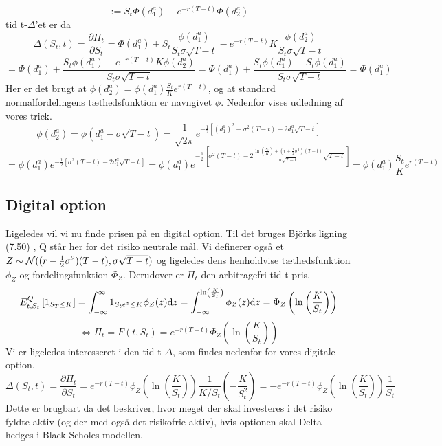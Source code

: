 \documentclass{article}
\theoremstyle{definition}
\theoremstyle{remark}
\newcommand\ens{\Leftrightarrow}
\begin{document}
$$:= S_t\Phi(d_1^a)-e^{-r(T-t)}\Phi(d_2^a)$$
tid t-$\Delta$'et er da
$$\Delta(S_t,t) = \frac{\partial \Pi_t}{\partial S_t}=\Phi(d_1^a)+S_t\frac{\phi(d_1^a)}{S_t\sigma\sqrt{T-t}}-e^{-r(T-t)}K\frac{\phi(d_2^a)}{S_t\sigma\sqrt{T-t}}$$
$$=\Phi(d_1^a)+\frac{S_t\phi(d_1^a)-e^{-r(T-t)}K\phi(d_2^a)}{S_t\sigma\sqrt{T-t}}=\Phi(d_1^a)+\frac{S_t\phi(d_1^a)-S_t\phi(d_1^a)}{S_t\sigma\sqrt{T-t}}=\Phi(d_1^a)$$
Her er det brugt at $\phi(d_2^a)=\phi(d_1^a)\frac{S_t}{K}e^{r(T-t)}$, og at standard normalfordelingens tæthedsfunktion er navngivet $\phi$. Nedenfor vises udledning af vores trick.
$$\phi(d_2^a)=\phi(d_1^a-\sigma\sqrt{T-t})=\frac{1}{\sqrt{2\pi}}e^{-\frac12\left[(d_1^a)^2+\sigma^2(T-t)-2d_1^a\sqrt{T-t}\right]}$$
$$=\phi(d_1^a)e^{-\frac12\left[\sigma^2(T-t)-2d_1^a\sqrt{T-t}\right]}=\phi(d_1^a)e^{-\frac12\left[\sigma^2(T-t)-2\frac{\ln\left(\frac{S_t}{K}\right)+(r+\frac12\sigma^2)(T-t)}{\sigma\sqrt{T-t}}\sqrt{T-t}\right]}=\phi(d_1^a)\frac{S_t}{K}e^{r(T-t)}$$
\subsection{Digital option}
Ligeledes vil vi nu finde prisen på en digital option. Til det bruges Björks ligning (7.50) \cite{Bjork2020}, Q står her for det risiko neutrale mål. Vi definerer også et $\\Z\sim\mathcal N((r-\frac12\sigma^2)(T-t),\sigma\sqrt{T-t})$ og ligeledes dens henholdvise tæthedsfunktion $\phi_Z$ og fordelingsfunktion $\Phi_Z$. Derudover er $\Pi_t$ den arbitragefri tid-t pris. 
$$E^Q_{t,S_t}\left[1_{S_T\leq K}\right]=\int_{-\infty}^{\infty}1_{S_te^{z}\leq K}\phi_Z(z)\text dz=\int_{-\infty}^{\ln\left(\frac K{S_t}\right)}\phi_Z(z)\text d z=\Phi_Z\left(\ln\left(\frac{K}{S_t}\right)\right)$$
$$\ens \Pi_t=F(t,S_t)=e^{-r(T-t)}\Phi_Z\left(\ln\left(\frac{K}{S_t}\right)\right)$$
Vi er ligeledes interesseret i den tid t $\Delta$, som findes nedenfor for vores digitale option.
$$\Delta(S_t,t)=\frac{\partial \Pi_t}{\partial S_t}=e^{-r(T-t)}\phi_Z\left(\ln\left(\frac{K}{S_t}\right)\right)\frac{1}{K/S_t}\left(-\frac{K}{S_t^2}\right)=-e^{-r(T-t)}\phi_Z\left(\ln\left(\frac{K}{S_t}\right)\right)\frac{1}{S_t}$$
Dette er brugbart da det beskriver, hvor meget der skal investeres i det risiko fyldte aktiv (og der med også det risikofrie aktiv), hvis optionen skal Delta-hedges i Black-Scholes modellen.
\end{document}
